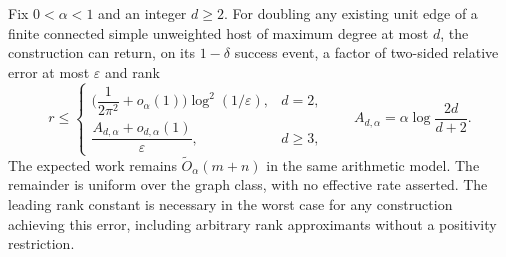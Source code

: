\begin{corollary}
\label{alg:cor:sharp-degree}
Fix $0<\alpha<1$ and an integer $d\ge2$. For doubling any existing
unit edge of a finite connected simple unweighted host of maximum degree
at most $d$, the construction can return, on its $1-\delta$ success event,
a factor of two-sided relative error at most $\varepsilon$ and rank
\[
 r\le
 \begin{cases}
 \bigl(\dfrac1{2\pi^2}+o_\alpha(1)\bigr)\log^2(1/\varepsilon),&d=2,\\[3pt]
 \dfrac{A_{d,\alpha}+o_{d,\alpha}(1)}{\varepsilon},&d\ge3,
 \end{cases}
 \qquad A_{d,\alpha}=\alpha\log\dfrac{2d}{d+2}.
\]
The expected work remains $\widetilde O_\alpha(m+n)$ in the same
arithmetic model. The remainder is uniform over the graph class, with
no effective rate asserted. The leading rank constant is necessary in
the worst case for any construction achieving this error, including
arbitrary rank approximants without a positivity restriction.
\end{corollary}

